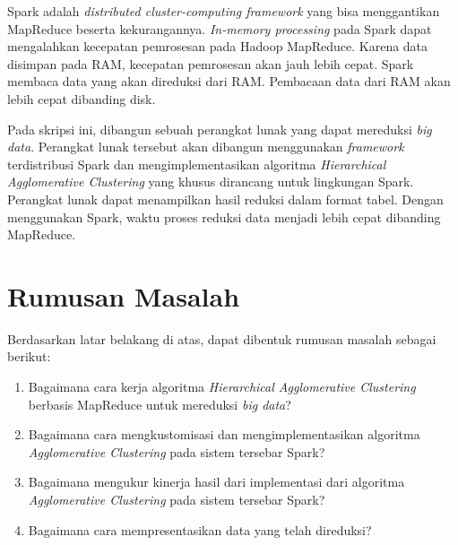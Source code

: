 Spark adalah {\it distributed cluster-computing framework} yang bisa menggantikan MapReduce beserta kekurangannya. {\it In-memory processing} pada Spark dapat mengalahkan kecepatan pemrosesan pada Hadoop MapReduce. Karena data disimpan pada RAM, kecepatan pemrosesan akan jauh lebih cepat. Spark membaca data yang akan direduksi dari RAM. Pembacaan data dari RAM akan lebih cepat dibanding disk.

Pada skripsi ini, dibangun sebuah perangkat lunak yang dapat mereduksi {\it big data}. Perangkat lunak tersebut akan dibangun menggunakan \textit{framework} terdistribusi Spark dan mengimplementasikan algoritma {\it Hierarchical Agglomerative Clustering} yang khusus dirancang untuk lingkungan Spark. Perangkat lunak dapat menampilkan hasil reduksi dalam format tabel. Dengan menggunakan Spark, waktu proses reduksi data menjadi lebih cepat dibanding MapReduce.




\section{Rumusan Masalah}
\label{sec:rumusan}
Berdasarkan latar belakang di atas, dapat dibentuk rumusan masalah sebagai berikut:
\begin{enumerate}

\item Bagaimana cara kerja algoritma {\it Hierarchical Agglomerative Clustering} berbasis MapReduce untuk mereduksi {\it big data}?

\item Bagaimana cara mengkustomisasi dan mengimplementasikan algoritma {\it Agglomerative Clustering} pada sistem tersebar Spark?

\item Bagaimana mengukur kinerja hasil dari implementasi dari algoritma {\it Agglomerative Clustering} pada sistem tersebar Spark?

\item Bagaimana cara mempresentasikan data yang telah direduksi?

\end{enumerate}



